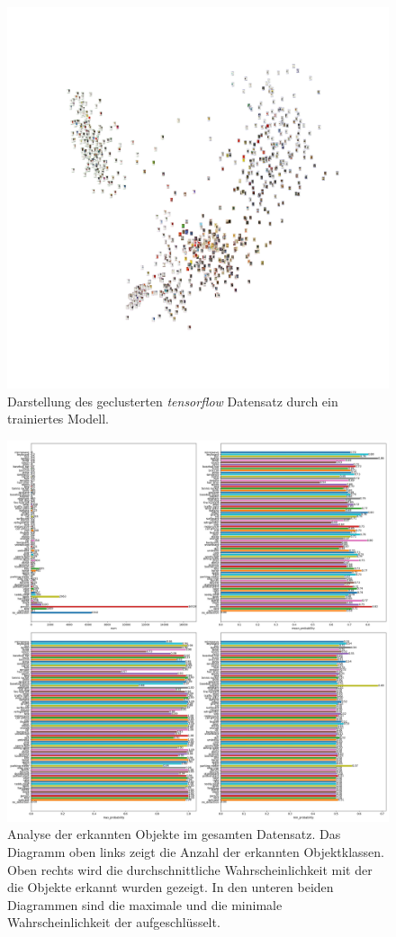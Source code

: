 \documentclass[a4paper,12pt,ngerman]{article}
\begin{document}
\newpage
\begin{figure}[ht]
\includegraphics[width=\linewidth]{image_cluster_trained}
\centering
\caption{Darstellung des geclusterten \textit{tensorflow} Datensatz durch ein trainiertes Modell.}
\end{figure}

\newpage
\begin{figure}[ht]
\includegraphics[width=\linewidth]{Analyse_des_gesamten_Datensatzes}
\centering
\caption{Analyse der erkannten Objekte im gesamten Datensatz. Das Diagramm oben links zeigt die Anzahl der erkannten Objektklassen. Oben rechts wird die durchschnittliche Wahrscheinlichkeit mit der die Objekte erkannt wurden gezeigt. In den unteren beiden Diagrammen sind die maximale und die minimale Wahrscheinlichkeit der aufgeschlüsselt.}
\end{figure}
\end{document}
